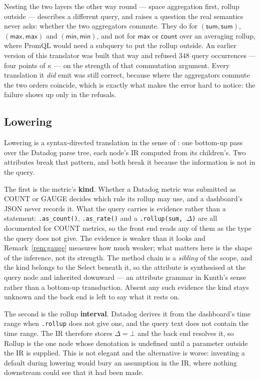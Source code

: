Nesting the two layers the other way round --- space aggregation first, rollup outside
--- describes a different query, and raises a question the real semantics never asks:
whether the two aggregators commute. They do for $(\mathsf{sum},\mathsf{sum})$,
$(\mathsf{max},\mathsf{max})$ and $(\mathsf{min},\mathsf{min})$, and not for
$\mathsf{max}$ or $\mathsf{count}$ over an averaging rollup, where PromQL would need a
subquery to put the rollup outside. An earlier version of this translator was built that
way and refused $348$ query occurrences --- four points of $\kappa$ --- on the strength
of that commutation argument. Every translation it \emph{did} emit was still correct,
because where the aggregators commute the two orders coincide, which is exactly what
makes the error hard to notice: the failure shows up only in the refusals.

\iffull\fi

\subsection{Lowering}
\label{sec:lowering}

Lowering is a syntax-directed translation in the sense of \citet{lewis1968}: one bottom-up
pass over the Datadog parse tree, each node's IR computed from its children's. Two
attributes break that pattern, and both break it because the information is not in the
query.

The first is the metric's \textbf{kind}. Whether a Datadog metric was submitted as COUNT
or GAUGE decides which rule its rollup may use, and a dashboard's JSON never records it.
What the query carries is evidence rather than a statement: \texttt{.as\_count()},
\texttt{.as\_rate()} and a \texttt{.rollup(sum, $\Delta$)} are all documented for COUNT
metrics, so the front end reads any of them as the type the query does not give. The
evidence is weaker than it looks and Remark~\ref{rem:gauge} measures how much weaker;
what matters here is the shape of the inference, not its strength. The
method chain is a \emph{sibling} of the scope, and the kind belongs to the
$\mathrm{Select}$ beneath it, so the attribute is synthesised at the query node and
inherited downward --- an attribute grammar in Knuth's sense~\citep{knuth1968} rather
than a bottom-up transduction. Absent any such evidence the kind stays $\text{unknown}$
and the back end is left to say what it rests on.

The second is the rollup \textbf{interval}. Datadog derives it from the dashboard's time
range when \texttt{.rollup} does not give one, and the query text does not contain the
time range. The IR therefore stores $\Delta=\bot$ and the back end resolves it, so
$\mathrm{Rollup}$ is the one node whose denotation is undefined until a parameter outside
the IR is supplied. This is not elegant and the alternative is worse: inventing a default
during lowering would bury an assumption in the IR, where nothing downstream could see
that it had been made.

